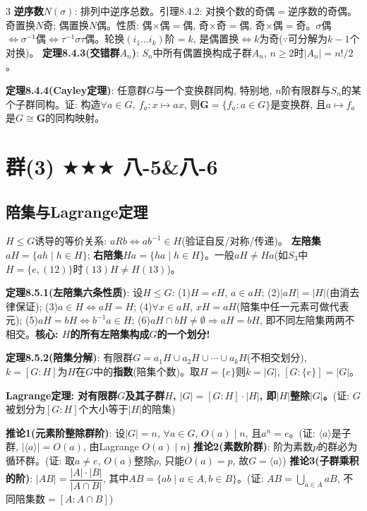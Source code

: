 \documentclass[4.5pt,landscape]{extarticle}
\newcommand{\rd}[1]{\textcolor{rd}{\textbf{#1}}}
\newcommand{\xt}[1]{\textbf{#1}}
\begin{document}
\begin{multicols*}{3}
\xt{逆序数$N(\sigma)$}: 排列中逆序总数。引理8.4.2: 对换个数的奇偶$=$逆序数的奇偶。奇置换$N$奇; 偶置换$N$偶。性质: 偶$\times$偶$=$偶, 奇$\times$奇$=$偶, 奇$\times$偶$=$奇。$\sigma$偶$\Leftrightarrow\sigma^{-1}$偶$\Leftrightarrow\tau^{-1}\sigma\tau$偶。轮换$(i_1\dots i_k)$阶$=k$, 是偶置换$\Leftrightarrow k$为奇($\because$可分解为$k-1$个对换)。
\rd{定理8.4.3(交错群$A_n$)}: $S_n$中所有偶置换构成子群$A_n$, $n\geq2$时$|A_n|=n!/2$。

\rd{定理8.4.4(Cayley定理)}: 任意群$G$与一个变换群同构, 特别地, $n$阶有限群与$S_n$的某个子群同构。证: 构造$\forall a\in G,\ f_a:x\mapsto ax$, 则$\mathbf G=\{f_a:a\in G\}$是变换群, 且$a\mapsto f_a$是$G\cong\mathbf G$的同构映射。

\section{群(3) $\bigstar\bigstar\bigstar$ 八-5\&八-6}
\subsection{陪集与Lagrange定理}
$H\leq G$诱导的等价关系: $aRb\Leftrightarrow ab^{-1}\in H$(验证自反/对称/传递)。
\xt{左陪集$aH=\{ah\mid h\in H\}$}; \xt{右陪集$Ha=\{ha\mid h\in H\}$}。一般$aH\neq Ha$(如$S_3$中$H=\{e,(12)\}$时$(13)H\neq H(13)$)。

\rd{定理8.5.1(左陪集六条性质)}: 设$H\leq G$:
(1)$H=eH$, $a\in aH$;
(2)$|aH|=|H|$(由消去律保证);
(3)$a\in H\Leftrightarrow aH=H$;
(4)$\forall x\in aH$, $xH=aH$(陪集中任一元素可做代表元);
(5)$aH=bH\Leftrightarrow b^{-1}a\in H$;
(6)$aH\cap bH\neq\emptyset\Rightarrow aH=bH$, 即不同左陪集两两不相交。\rd{核心: $H$的所有左陪集构成$G$的一个划分!}

\rd{定理8.5.2(陪集分解)}: 有限群$G=a_1H\cup a_2H\cup\cdots\cup a_kH$(不相交划分), $k=[G:H]$为$H$在$G$中的\xt{指数}(陪集个数)。取$H=\{e\}$则$k=|G|$, $[G:\{e\}]=|G|$。

\rd{Lagrange定理: 对有限群$G$及其子群$H$, $|G|=[G:H]\cdot|H|$, 即$|H|$整除$|G|$。}(证: $G$被划分为$[G:H]$个大小等于$|H|$的陪集)

\rd{推论1(元素阶整除群阶)}: 设$|G|=n$, $\forall a\in G$, $O(a)\mid n$, 且$a^n=e$。(证: $\langle a\rangle$是子群, $|\langle a\rangle|=O(a)$, 由Lagrange $O(a)\mid n$)
\rd{推论2(素数阶群)}: 阶为素数$p$的群必为循环群。(证: 取$a\neq e$, $O(a)$整除$p$, 只能$O(a)=p$, 故$G=\langle a\rangle$)
\rd{推论3(子群乘积的阶)}: $|AB|=\dfrac{|A|\cdot|B|}{|A\cap B|}$, 其中$AB=\{ab\mid a\in A,b\in B\}$。(证: $AB=\bigcup_{a\in A}aB$, 不同陪集数$=[A:A\cap B]$)


\end{multicols*}
\end{document}
